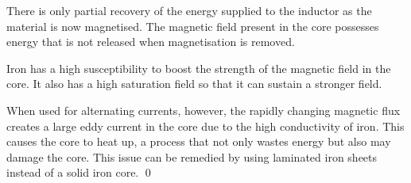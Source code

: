 \documentclass[12pt]{article}
\begin{document}
There is only partial recovery of the energy supplied to the inductor as the material is now magnetised. The magnetic field present in the core possesses energy that is not released when magnetisation is removed.

Iron has a high susceptibility to boost the strength of the magnetic field in the core. It also has a high saturation field so that it can sustain a stronger field.

When used for alternating currents, however, the rapidly changing magnetic flux creates a large eddy current in the core due to the high conductivity of iron. This causes the core to heat up, a process that not only wastes energy but also may damage the core. This issue can be remedied by using laminated iron sheets instead of a solid iron core.
\qed
\end{document}
